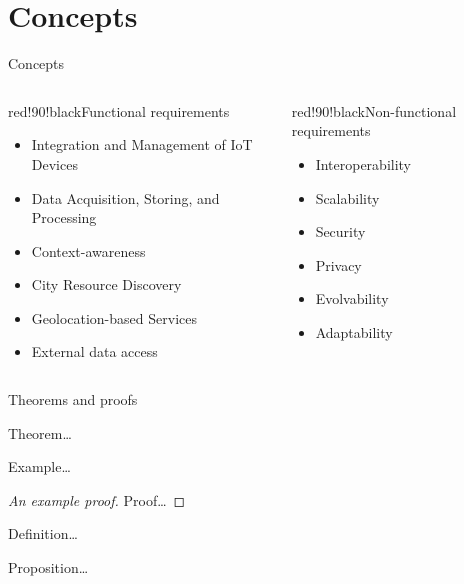 \section{Concepts}

\begin{frame}{Concepts}
  \begin{columns}[t]
    \col
      \begin{coloredblock}{red!90!black}{Functional requirements}
        \begin{itemize}
          \item Integration and Management of IoT Devices
          \item Data Acquisition, Storing, and Processing
          \item Context-awareness
          \item City Resource Discovery
          \item Geolocation-based Services
          \item External data access
        \end{itemize}
      \end{coloredblock}

    \col
      \begin{coloredblock}{red!90!black}{Non-functional requirements}
        \begin{itemize}
          \item Interoperability
          \item Scalability
          \item Security
          \item Privacy
          \item Evolvability
          \item Adaptability
        \end{itemize}
      \end{coloredblock}
  \end{columns}
\end{frame}

\begin{frame}{Theorems and proofs}
  \pause
  \begin{theorem}
    Theorem\dots
  \end{theorem}

  \pause
  \begin{example}
    Example\dots
  \end{example}

  \pause
  \begin{proof}[An example proof]
    Proof\dots
  \end{proof}

  \pause
  \begin{definition}
    Definition\dots
  \end{definition}

  \pause
  \begin{proposition}
    Proposition\dots
  \end{proposition}
\end{frame}

